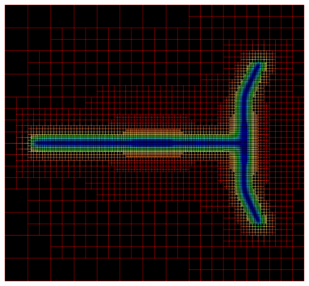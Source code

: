 \documentclass{beamer}
\begin{document}
\begin{frame}
\begin{overlayarea}{\textwidth}{0.6\textheight}
\begin{center}
{        \includegraphics[height=0.6\textheight]{figs/doublecrack}%
      }%
      \\ %
    \end{center}
  \end{overlayarea}
\end{frame}
\end{document}
